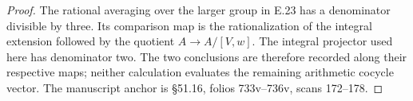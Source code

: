 \begin{proof}
The rational averaging over the larger group in
E.23 has a denominator divisible by three.
Its comparison map is the rationalization of
the integral extension followed by the quotient
$A\to A/[V,w]$. The integral projector used here
has denominator two. The two conclusions are
therefore recorded along their respective maps;
neither calculation evaluates the remaining
arithmetic cocycle vector. The manuscript anchor
is \S51.16, folios 733v--736v, scans 172--178.
\end{proof}

